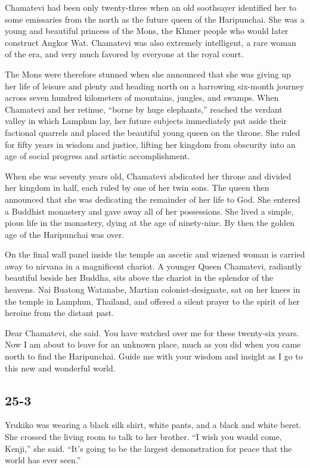 \documentclass[]{article}
\begin{document}
{Chamatevi had been only twenty-three when an old soothsayer identified her to some emissaries from the north as the future queen of the Haripunchai. She was a young and beautiful princess of the Mons, the Khmer people who would later construct Angkor Wat. Chamatevi was also extremely intelligent, a rare woman of the era, and very much favored by everyone at the royal court.

The Mons were therefore stunned when she announced that she was giving up her life of leisure and plenty and heading north on a harrowing six-month journey across seven hundred kilometers of mountains, jungles, and swamps. When Chamatevi and her retinue, “borne by huge elephants,” reached the verdant valley in which Lamphun lay, her future subjects immediately put aside their factional quarrels and placed the beautiful young queen on the throne. She ruled for fifty years in wisdom and justice, lifting her kingdom from obscurity into an age of social progress and artistic accomplishment.

When she was seventy years old, Chamatevi abdicated her throne and divided her kingdom in half, each ruled by one of her twin sons. The queen then announced that she was dedicating the remainder of her life to God. She entered a Buddhist monastery and gave away all of her possessions. She lived a simple, pious life in the monastery, dying at the age of ninety-nine. By then the golden age of the Haripunchai was over.

On the final wall panel inside the temple an ascetic and wizened woman is carried away to nirvana in a magnificent chariot. A younger Queen Chamatevi, radiantly beautiful beside her Buddha, sits above the chariot in the splendor of the heavens. Nai Buatong Watanabe, Martian colonist-designate, sat on her knees in the temple in Lamphun, Thailand, and offered a silent prayer to the spirit of her heroine from the distant past.

Dear Chamatevi, she said. You have watched over me for these twenty-six years. Now I am about to leave for an unknown place, much as you did when you came north to find the Haripunchai. Guide me with your wisdom and insight as I go to this new and wonderful world.


\subsection{25-3}

Yrukiko was wearing a black silk shirt, white pants, and a black and white beret. She crossed the living room to talk to her brother. “I wish you would come, Kenji,” she said. “It’s going to be the largest demonstration for peace that the world has ever seen.”

}
\end{document}
